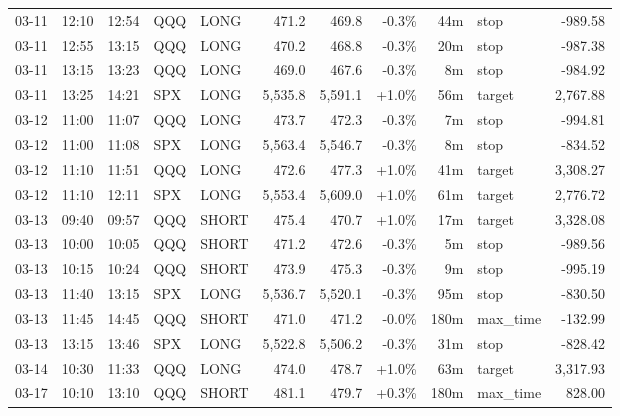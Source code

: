\documentclass[11pt,a4paper,twoside]{article}
\begin{document}
\begin{center}
\begin{longtable}{>{\color{txtmain}}l l l l l r r r r >{\color{txtmain}}l r}
03-11 & 12:10 & 12:54 & QQQ & LONG & 471.2 & 469.8 & \textcolor{lossred}{-0.3\%} & 44m & stop & \textcolor{lossred}{-989.58} \\
03-11 & 12:55 & 13:15 & QQQ & LONG & 470.2 & 468.8 & \textcolor{lossred}{-0.3\%} & 20m & stop & \textcolor{lossred}{-987.38} \\
03-11 & 13:15 & 13:23 & QQQ & LONG & 469.0 & 467.6 & \textcolor{lossred}{-0.3\%} & 8m & stop & \textcolor{lossred}{-984.92} \\
03-11 & 13:25 & 14:21 & SPX & LONG & 5,535.8 & 5,591.1 & \textcolor{wingreen}{+1.0\%} & 56m & target & \textcolor{wingreen}{2,767.88} \\
03-12 & 11:00 & 11:07 & QQQ & LONG & 473.7 & 472.3 & \textcolor{lossred}{-0.3\%} & 7m & stop & \textcolor{lossred}{-994.81} \\
03-12 & 11:00 & 11:08 & SPX & LONG & 5,563.4 & 5,546.7 & \textcolor{lossred}{-0.3\%} & 8m & stop & \textcolor{lossred}{-834.52} \\
03-12 & 11:10 & 11:51 & QQQ & LONG & 472.6 & 477.3 & \textcolor{wingreen}{+1.0\%} & 41m & target & \textcolor{wingreen}{3,308.27} \\
03-12 & 11:10 & 12:11 & SPX & LONG & 5,553.4 & 5,609.0 & \textcolor{wingreen}{+1.0\%} & 61m & target & \textcolor{wingreen}{2,776.72} \\
03-13 & 09:40 & 09:57 & QQQ & SHORT & 475.4 & 470.7 & \textcolor{wingreen}{+1.0\%} & 17m & target & \textcolor{wingreen}{3,328.08} \\
03-13 & 10:00 & 10:05 & QQQ & SHORT & 471.2 & 472.6 & \textcolor{lossred}{-0.3\%} & 5m & stop & \textcolor{lossred}{-989.56} \\
03-13 & 10:15 & 10:24 & QQQ & SHORT & 473.9 & 475.3 & \textcolor{lossred}{-0.3\%} & 9m & stop & \textcolor{lossred}{-995.19} \\
03-13 & 11:40 & 13:15 & SPX & LONG & 5,536.7 & 5,520.1 & \textcolor{lossred}{-0.3\%} & 95m & stop & \textcolor{lossred}{-830.50} \\
03-13 & 11:45 & 14:45 & QQQ & SHORT & 471.0 & 471.2 & \textcolor{lossred}{-0.0\%} & 180m & max\_time & \textcolor{lossred}{-132.99} \\
03-13 & 13:15 & 13:46 & SPX & LONG & 5,522.8 & 5,506.2 & \textcolor{lossred}{-0.3\%} & 31m & stop & \textcolor{lossred}{-828.42} \\
03-14 & 10:30 & 11:33 & QQQ & LONG & 474.0 & 478.7 & \textcolor{wingreen}{+1.0\%} & 63m & target & \textcolor{wingreen}{3,317.93} \\
03-17 & 10:10 & 13:10 & QQQ & SHORT & 481.1 & 479.7 & \textcolor{wingreen}{+0.3\%} & 180m & max\_time & \textcolor{wingreen}{828.00} \\

\end{longtable}
\end{center}
\end{document}
